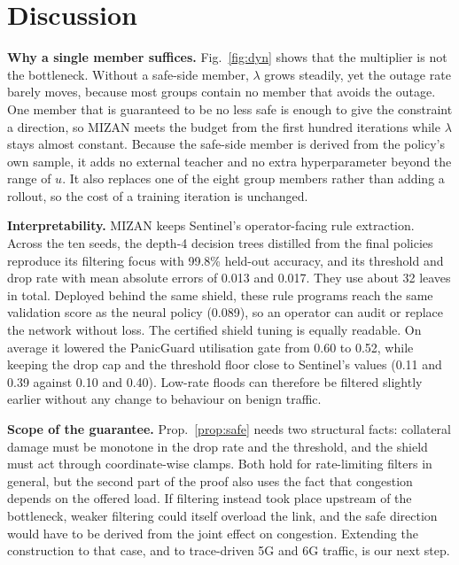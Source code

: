 \documentclass[journal]{IEEEtran}
\begin{document}
\section{Discussion}
\textbf{Why a single member suffices.} Fig.~\ref{fig:dyn} shows that the multiplier is not the bottleneck. Without a safe-side member, $\lambda$ grows steadily, yet the outage rate barely moves, because most groups contain no member that avoids the outage. One member that is guaranteed to be no less safe is enough to give the constraint a direction, so MIZAN meets the budget from the first hundred iterations while $\lambda$ stays almost constant. Because the safe-side member is derived from the policy's own sample, it adds no external teacher and no extra hyperparameter beyond the range of $u$. It also replaces one of the eight group members rather than adding a rollout, so the cost of a training iteration is unchanged.

\textbf{Interpretability.} MIZAN keeps Sentinel's operator-facing rule extraction. Across the ten seeds, the depth-4 decision trees distilled from the final policies reproduce its filtering focus with 99.8\% held-out accuracy, and its threshold and drop rate with mean absolute errors of 0.013 and 0.017. They use about 32 leaves in total. Deployed behind the same shield, these rule programs reach the same validation score as the neural policy (0.089), so an operator can audit or replace the network without loss. The certified shield tuning is equally readable. On average it lowered the PanicGuard utilisation gate from 0.60 to 0.52, while keeping the drop cap and the threshold floor close to Sentinel's values (0.11 and 0.39 against 0.10 and 0.40). Low-rate floods can therefore be filtered slightly earlier without any change to behaviour on benign traffic.

\textbf{Scope of the guarantee.} Prop.~\ref{prop:safe} needs two structural facts: collateral damage must be monotone in the drop rate and the threshold, and the shield must act through coordinate-wise clamps. Both hold for rate-limiting filters in general, but the second part of the proof also uses the fact that congestion depends on the offered load. If filtering instead took place upstream of the bottleneck, weaker filtering could itself overload the link, and the safe direction would have to be derived from the joint effect on congestion. Extending the construction to that case, and to trace-driven 5G and 6G traffic, is our next step.
\end{document}
